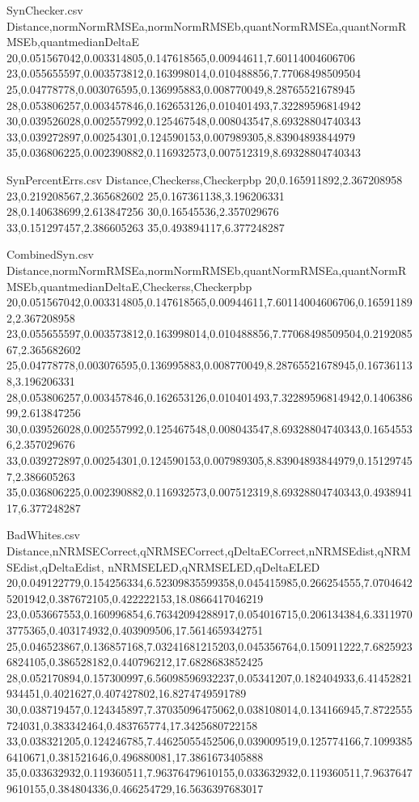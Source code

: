 \begin{filecontents*}{SynChecker.csv}
Distance,normNormRMSEa,normNormRMSEb,quantNormRMSEa,quantNormRMSEb,quantmedianDeltaE
20,0.051567042,0.003314805,0.147618565,0.00944611,7.60114004606706
23,0.055655597,0.003573812,0.163998014,0.010488856,7.77068498509504
25,0.04778778,0.003076595,0.136995883,0.008770049,8.28765521678945
28,0.053806257,0.003457846,0.162653126,0.010401493,7.32289596814942
30,0.039526028,0.002557992,0.125467548,0.008043547,8.69328804740343
33,0.039272897,0.00254301,0.124590153,0.007989305,8.83904893844979
35,0.036806225,0.002390882,0.116932573,0.007512319,8.69328804740343
\end{filecontents*}

\begin{filecontents*}{SynPercentErrs.csv}
Distance,Checkerss,Checkerpbp
20,0.165911892,2.367208958
23,0.219208567,2.365682602
25,0.167361138,3.196206331
28,0.140638699,2.613847256
30,0.16545536,2.357029676
33,0.151297457,2.386605263
35,0.493894117,6.377248287
\end{filecontents*}

\begin{filecontents*}{CombinedSyn.csv}
Distance,normNormRMSEa,normNormRMSEb,quantNormRMSEa,quantNormRMSEb,quantmedianDeltaE,Checkerss,Checkerpbp
20,0.051567042,0.003314805,0.147618565,0.00944611,7.60114004606706,0.165911892,2.367208958
23,0.055655597,0.003573812,0.163998014,0.010488856,7.77068498509504,0.219208567,2.365682602
25,0.04778778,0.003076595,0.136995883,0.008770049,8.28765521678945,0.167361138,3.196206331
28,0.053806257,0.003457846,0.162653126,0.010401493,7.32289596814942,0.140638699,2.613847256
30,0.039526028,0.002557992,0.125467548,0.008043547,8.69328804740343,0.16545536,2.357029676
33,0.039272897,0.00254301,0.124590153,0.007989305,8.83904893844979,0.151297457,2.386605263
35,0.036806225,0.002390882,0.116932573,0.007512319,8.69328804740343,0.493894117,6.377248287
\end{filecontents*}

\begin{filecontents*}{BadWhites.csv}
Distance,nNRMSECorrect,qNRMSECorrect,qDeltaECorrect,nNRMSEdist,qNRMSEdist,qDeltaEdist, nNRMSELED,qNRMSELED,qDeltaELED
20,0.049122779,0.154256334,6.52309835599358,0.045415985,0.266254555,7.07046425201942,0.387672105,0.422222153,18.0866417046219
23,0.053667553,0.160996854,6.76342094288917,0.054016715,0.206134384,6.33119703775365,0.403174932,0.403909506,17.5614659342751
25,0.046523867,0.136857168,7.03241681215203,0.045356764,0.150911222,7.68259236824105,0.386528182,0.440796212,17.6828683852425
28,0.052170894,0.157300997,6.56098596932237,0.05341207,0.182404933,6.41452821934451,0.4021627,0.407427802,16.8274749591789
30,0.038719457,0.124345897,7.37035096475062,0.038108014,0.134166945,7.8722555724031,0.383342464,0.483765774,17.3425680722158
33,0.038321205,0.124246785,7.44625055452506,0.039009519,0.125774166,7.10993856410671,0.381521646,0.496880081,17.3861673405888
35,0.033632932,0.119360511,7.96376479610155,0.033632932,0.119360511,7.96376479610155,0.384804336,0.466254729,16.5636397683017
\end{filecontents*}

\DeactivateWarningFilters[csv]